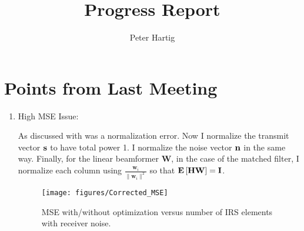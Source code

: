 \documentclass[12pt,a4paper]{report}
\title{Progress Report}
\author{Peter Hartig}
\begin{document}
\maketitle
\tableofcontents
\section{Points from Last Meeting}
\begin{enumerate}
\item{High MSE Issue:} \par
	As discussed with was a normalization error. Now I normalize the transmit vector $\mathbf{s}$ to have total power 1. I normalize the noise vector $\mathbf{n}$ in the same way.
	Finally, for the linear beamformer $\mathbf{W}$, in the case of the matched filter, I normalize each column using $\frac{\mathbf{w}_i}{\|\mathbf{w}_i\|^2}$ so that
	$\mathop{\bf E{}}\left[\mathbf{H}\mathbf{W}\right] = \mathbf{I}$.
	
	\begin{figure}[H]
	\texttt{[image: figures/Corrected\_MSE]}
	  \caption{MSE with/without optimization versus number of IRS elements with receiver noise.}
	  	  \label{MSE_opt_noise}
	\end{figure}	
	

\end{enumerate}
\end{document}
